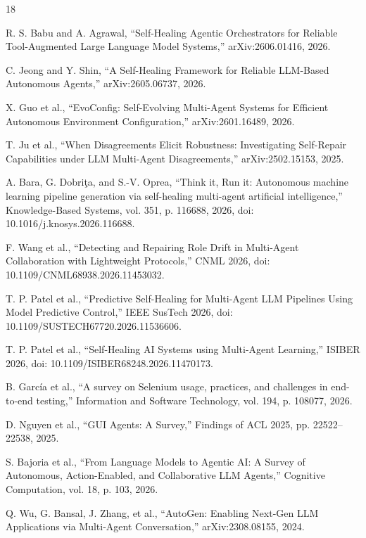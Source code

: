\documentclass[conference]{IEEEtran}
\begin{document}
\begin{thebibliography}{18}

R. S. Babu and A. Agrawal,
``Self-Healing Agentic Orchestrators for Reliable Tool-Augmented Large Language Model Systems,''
arXiv:2606.01416, 2026.

C. Jeong and Y. Shin,
``A Self-Healing Framework for Reliable LLM-Based Autonomous Agents,''
arXiv:2605.06737, 2026.

X. Guo et al.,
``EvoConfig: Self-Evolving Multi-Agent Systems for Efficient Autonomous Environment Configuration,''
arXiv:2601.16489, 2026.

T. Ju et al.,
``When Disagreements Elicit Robustness: Investigating Self-Repair Capabilities under LLM Multi-Agent Disagreements,''
arXiv:2502.15153, 2025.

A. Bara, G. Dobriţa, and S.-V. Oprea,
``Think it, Run it: Autonomous machine learning pipeline generation via self-healing multi-agent artificial intelligence,''
Knowledge-Based Systems, vol. 351, p. 116688, 2026,
doi: 10.1016/j.knosys.2026.116688.

F. Wang et al.,
``Detecting and Repairing Role Drift in Multi-Agent Collaboration with Lightweight Protocols,''
CNML 2026,
doi: 10.1109/CNML68938.2026.11453032.

T. P. Patel et al.,
``Predictive Self-Healing for Multi-Agent LLM Pipelines Using Model Predictive Control,''
IEEE SusTech 2026,
doi: 10.1109/SUSTECH67720.2026.11536606.

T. P. Patel et al.,
``Self-Healing AI Systems using Multi-Agent Learning,''
ISIBER 2026,
doi: 10.1109/ISIBER68248.2026.11470173.

B. García et al.,
``A survey on Selenium usage, practices, and challenges in end-to-end testing,''
Information and Software Technology, vol. 194, p. 108077, 2026.

D. Nguyen et al.,
``GUI Agents: A Survey,''
Findings of ACL 2025, pp. 22522--22538, 2025.

S. Bajoria et al.,
``From Language Models to Agentic AI: A Survey of Autonomous, Action-Enabled, and Collaborative LLM Agents,''
Cognitive Computation, vol. 18, p. 103, 2026.

Q. Wu, G. Bansal, J. Zhang, et al.,
``AutoGen: Enabling Next-Gen LLM Applications via Multi-Agent Conversation,''
arXiv:2308.08155, 2024.


\end{thebibliography}
\end{document}
